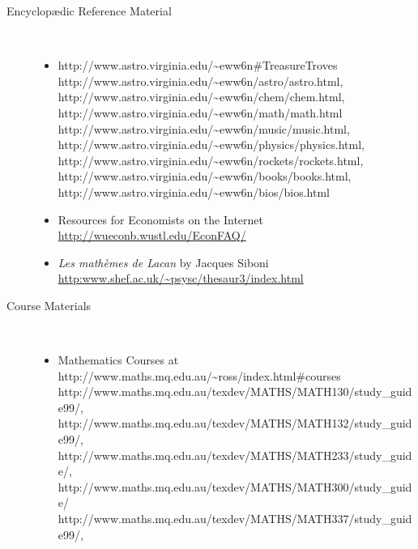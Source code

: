 \begin{description}
\begin{itemize}
%

\end{itemize}


\htmlrule[50\% center]

\item[Encyclop\ae{}dic Reference Material]~%
\begin{itemize}
\item
{}%
{http://www.astro.virginia.edu/\~{}eww6n\#TreasureTroves} 
%
{http://www.astro.virginia.edu/\~{}eww6n/astro/astro.html}, 
%
{http://www.astro.virginia.edu/\~{}eww6n/chem/chem.html}, 
%
{http://www.astro.virginia.edu/\~{}eww6n/math/math.html}\\ 
%
{http://www.astro.virginia.edu/\~{}eww6n/music/music.html}, 
%
{http://www.astro.virginia.edu/\~{}eww6n/physics/physics.html}, 
%
{http://www.astro.virginia.edu/\~{}eww6n/rockets/rockets.html}, 
%
{http://www.astro.virginia.edu/\~{}eww6n/books/books.html}, 
%
{http://www.astro.virginia.edu/\~{}eww6n/bios/bios.html}
\html{\smallskip}

\item
Resources for Economists on the Internet\\
\url{http://wueconb.wustl.edu/EconFAQ/}
\html{\smallskip}

\item
\textit{Les math{\`e}mes de Lacan} by Jacques Siboni\\
\url{http:www.shef.ac.uk/~psysc/thesaur3/index.html}
\html{\smallskip}

\end{itemize}

\htmlrule[50\% center]


\item[Course Materials]~%
\begin{itemize}
\item
Mathematics Courses at %
{http://www.maths.mq.edu.au/\~{}ross/index.html\#courses}\\
%
{http://www.maths.mq.edu.au/texdev/MATHS/MATH130/study_guide99/}, 
%
{http://www.maths.mq.edu.au/texdev/MATHS/MATH132/study_guide99/}, 
%
{http://www.maths.mq.edu.au/texdev/MATHS/MATH233/study_guide/}, 
%
{http://www.maths.mq.edu.au/texdev/MATHS/MATH300/study_guide/}
%
{http://www.maths.mq.edu.au/texdev/MATHS/MATH337/study_guide99/}, 
\html{\smallskip}


\end{itemize}
\end{description}

